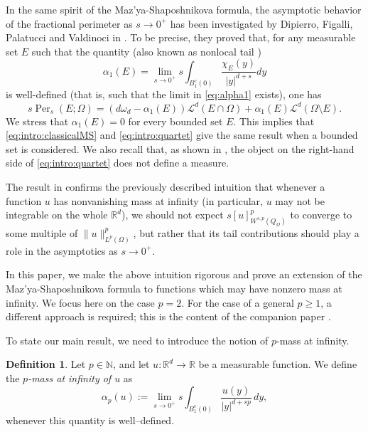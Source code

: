 \documentclass[reqno,11pt]{amsart}
\numberwithin{equation}{section}
\theoremstyle{definition} %
\theoremstyle{plain}
\theoremstyle{definition}
\newtheorem{dhef}[dhef]{Definition}
\theoremstyle{remark}
\def\elleom#1{L^{#1}(\Omega)}
\def\Qom{{Q_\Omega}}
\def\O{\Omega}
\def\norma#1#2{ \|#1 \|_{#2}}
\def\semin#1#2{ [#1 ]_{#2}}
\def\L{\mathcal{L}}
\def\N{\mathbb{N}}
\def\R{\mathbb{R}}
\newcommand{\abs}[1]{\left|#1\right|}
\begin{document}
{In the same spirit of the Maz'ya-Shaposhnikova formula, the asymptotic behavior of the fractional perimeter as $s\to0^+$ has been investigated by Dipierro, Figalli, Palatucci and Valdinoci in \cite{Quartet}. To be precise, they proved that, for any measurable set $E$ such that the quantity (also known as nonlocal tail \cite{KKP_note,KKP_Holdercont})
\begin{equation}
    \label{eq:alpha1}
\alpha_1(E)=\lim_{s\to 0^+}s\int_{B_1^c(0)}\frac{\chi_E(y)}{\abs{y}^{d+s}}dy
\end{equation}
is well-defined (that is, such that the limit in \eqref{eq:alpha1} exists), one has
\begin{equation}\label{eq:intro:quartet}
    s\operatorname{Per}_s(E;\Omega)=(d\omega_d-\alpha_1(E))\L^d(E\cap\O)+\alpha_1(E)\L^d(\O\setminus E).
\end{equation}
We stress that $\alpha_1(E)=0$ for every bounded set $E$. This implies that \eqref{eq:intro:classicalMS} and \eqref{eq:intro:quartet} give the same result when a bounded set is considered. We also recall that, as shown in \cite{Quartet}, the object on the right-hand side of \eqref{eq:intro:quartet} does not define a measure.

The result in \cite{Quartet} confirms the previously described intuition that  whenever a function $u$ has nonvanishing mass at infinity (in particular, $u$ may not be integrable on the whole $\R^d$), we should not expect $s\semin{u}{W^{s,p}(\Qom)}^p$ to converge to some multiple of $\norma{u}{\elleom p}^p$, but rather that its tail contributions should play a role in the asymptotics as $s\to 0^+$.

In this paper, we make the above intuition rigorous and prove an extension of the Maz'ya-Shaposhnikova formula to functions which may have nonzero mass at infinity. We focus here on the case $p=2$. For the case  of a general $p\geq 1$, a different approach is required; this is the content of the companion paper \cite{DaFaPi2}. 

To state our main result, we need to introduce the notion of $p$-mass at infinity.

\begin{dhef}
    \label{Def:alphau}
    Let $p\in \N$, and let $u:\R^d\to\R$ be a measurable function. We define the \emph{$p$-mass at infinity of $u$} as
    \begin{equation}
        \alpha_p(u):=\lim_{s\to0^+}s\int_{B_1^c(0)}\frac{u(y)}{\abs{y}^{d+sp}}\,dy,
    \end{equation}
    whenever this quantity is well--defined. 
\end{dhef}

}
\end{document}
